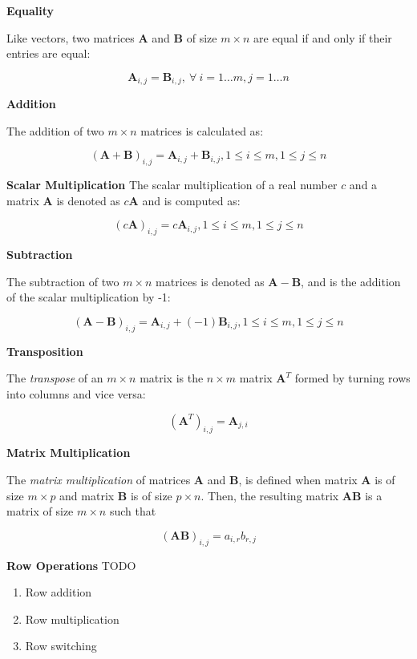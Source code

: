\documentclass[12pt]{article}
\begin{document}
\medskip
\noindent\textbf{Equality}

Like vectors, two matrices $\mathbf A$ and $\mathbf B$ of size $m \times n$ 
are equal if and only if their entries are equal:

$$\mathbf A_{i,j} = \mathbf B_{i,j},\ \forall~i = 1 \ldots m, j = 1 \ldots n$$

\medskip
\noindent\textbf{Addition}

\noindent The addition of two $m \times n$ matrices is calculated as:

$$(\mathbf A + \mathbf B)_{i,j} = \mathbf{A}_{i,j} + \mathbf{B}_{i,j}, 1 \leq i \leq m, 1 \leq j \leq n$$

\medskip
\noindent\textbf{Scalar Multiplication}
\noindent The scalar multiplication of a real number $c$ and a matrix $\mathbf{A}$ 
is denoted as $c\mathbf{A}$ and is computed as:

$$(c\mathbf A)_{i,j} = c\mathbf{A}_{i,j}, 1 \leq i \leq m, 1 \leq j \leq n$$

\medskip
\noindent\textbf{Subtraction}

\noindent The subtraction of two $m \times n$ matrices is denoted as $\mathbf{A} - \mathbf{B}$,
and is the addition of the scalar multiplication by -1:

$$(\mathbf A - \mathbf B)_{i,j} = \mathbf{A}_{i,j} + (-1)\mathbf{B}_{i,j}, 1 \leq i \leq m, 1 \leq j \leq n$$


\medskip
\noindent\textbf{Transposition}

\noindent The \textit{transpose} of an $m\times n$ matrix is the $n\times m$ matrix $\mathbf{A}^T$
formed by turning rows into columns and vice versa:

$$(\mathbf A^T)_{i,j} = \mathbf A_{j,i}$$

\medskip
\noindent\textbf{Matrix Multiplication}

\noindent The \textit{matrix multiplication} of matrices $\mathbf A$ and $\mathbf B$, is 
defined when matrix $\mathbf A$ is of size $m \times p$ and matrix $\mathbf B$ is of 
size $p \times n$. Then, the resulting matrix $\mathbf A\mathbf B$ is a matrix of size 
$m \times n$ such that

$$(\mathbf A\mathbf B)_{i,j} = a_{i,r}b_{r,j}$$


\medskip
\noindent\textbf{Row Operations}
TODO

\begin{enumerate}
\item Row addition
\item Row multiplication
\item Row switching
\end{enumerate}
\end{document}
